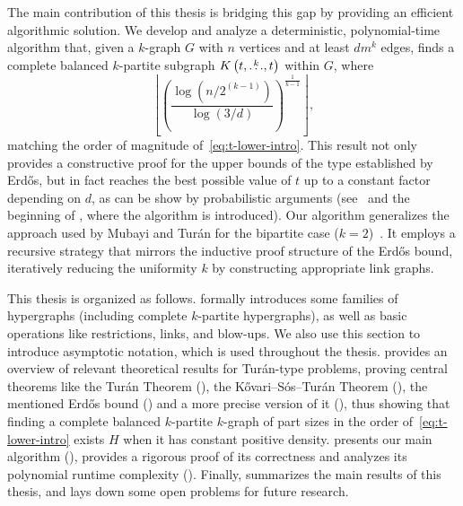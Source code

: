 The main contribution of this thesis is bridging this gap by providing an efficient algorithmic solution.
We develop and analyze a deterministic, polynomial-time algorithm that,
given a $k$-graph $G$ with $n$ vertices and at least $dm^k$ edges,
finds a complete balanced $k$-partite subgraph $K\left(t, \overset{k}{\dots}, t\right)$ within $G$, where
\[
    \left\lfloor \left(  \frac{\log \left(n/2^{(k-1)}\right)}{\log (3/d)} \right)^{\frac{1}{k-1}} \right\rfloor,
\]
matching the order of magnitude of~\eqref{eq:t-lower-intro}.
This result not only provides a constructive proof for the upper bounds of the type established by Erdős,
but in fact reaches the best possible value of $t$ up to a constant factor depending on $d$, as
can be show by probabilistic arguments (see~ and
the beginning of , where the algorithm is introduced).
Our algorithm generalizes the approach used by Mubayi and Turán for the bipartite case ($k=2$)~\cite{MUBAYI2010174}.
It employs a recursive strategy that mirrors the inductive proof structure of the Erdős bound,
iteratively reducing the uniformity $k$ by constructing appropriate link graphs.

This thesis is organized as follows.
 formally introduces some families of hypergraphs
(including complete $k$-partite hypergraphs),
as well as basic operations like restrictions, links, and blow-ups.
We also use this section to introduce asymptotic notation, which is used throughout the thesis.
 provides an overview of relevant theoretical results for Turán-type problems,
proving central theorems like the Turán Theorem (), the Kővari--Sós--Turán Theorem (),
the mentioned Erdős bound () and a more precise version of it (),
thus showing that finding a complete balanced $k$-partite $k$-graph of part sizes in the order of~\eqref{eq:t-lower-intro}
exists $H$ when it has constant positive density.
 presents our main algorithm (),
provides a rigorous proof of its correctness and analyzes its polynomial runtime complexity ().
Finally,  summarizes the main results of this thesis, and lays down some open problems for future research.
